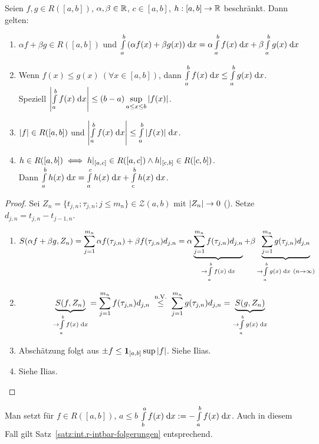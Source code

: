 \documentclass[12pt]{scrreprt}
\begin{document}
\begin{satz}
  \label{satz:int.r-intbar-folgerungen}
  Seien $f,g \in R([a,b])$, $\alpha, \beta \in\mathbb{R}$, $c\in[a,b]$,
  $h:[a,b]\rightarrow\mathbb{R}$ beschränkt. Dann gelten:
  \begin{enumerate}
  \item $\alpha f + \beta g \in R([a,b])$ und
    $\int\limits_{a}^{b}{\left(\alpha f(x) + \beta g(x)\right)}\;\mathrm{d}x =
    \alpha\int\limits_{a}^{b}{f(x)}\;\mathrm{d}x + \beta\int\limits_{a}^{b}{g(x)}\;\mathrm{d}x$
  \item Wenn $f(x)\le g(x)\ (\forall x\in[a,b])$, dann
    $\int\limits_{a}^{b}{f(x)}\;\mathrm{d}x\le\int\limits_{a}^{b}{g(x)}\;\mathrm{d}x$.\\Speziell
    $\left\lvert\int\limits_{a}^{b}{f(x)}\;\mathrm{d}x\right\lvert \le (b-a) \sup\limits_{a \le x \le b}{\left\lvert f(x)\right\lvert}$.
  \item $\left\lvert f\right\lvert\in R([a,b])$ und $\left\lvert\int\limits_{a}^{b}{f(x)}\;\mathrm{d}x\right\lvert \le
    \int\limits_{a}^{b}{\left\lvert f(x)\right\lvert}\;\mathrm{d}x$.
  \item $h\in R([a,b]) \iff h|_{[a,c]}\in R([a,c]) \wedge
    h|_{[c,b]}\in R([c,b])$.\\Dann $\int\limits_{a}^{b}{h(x)}\;\mathrm{d}x =
    \int\limits_{a}^{c}{h(x)}\;\mathrm{d}x + \int\limits_{c}^{b}{h(x)}\;\mathrm{d}x$.
  \end{enumerate}
\end{satz}
\begin{proof}
  Sei $Z_n=\{t_{j,n};\tau_{j,n};j\le m_n\} \in \mathcal{Z}(a,b)$ mit
  $\left\lvert Z_n\right\lvert\to0$ (\ninf). Setze $d_{j,n}=t_{j,n}-t_{j-1,n}$.
  \begin{enumerate}
  \item
    \[ S(\alpha f + \beta g, Z_n) = \sum_{j=1}^{m_n}{\alpha
      f(\tau_{j,n}) + \beta f(\tau_{j,n})d_{j,n}} 
    = \alpha \underbrace{\sum_{j=1}^{m_n}{f(\tau_{j,n})d_{j,n}}}_{\to \int\limits_{a}^{b}{f(x)}\;\mathrm{d}x} + \beta
    \underbrace{\sum_{j=1}^{m_n}{g(\tau_{j,n})d_{j,n}}}_{\to
      \int\limits_{a}^{b}{g(x)}\;\mathrm{d}x\ (n\rightarrow\infty)} \]
  \item \[\underbrace{S(f,Z_n)}_{\to\Integral{a}{b}{f(x)}{x}} =
    \sum_{j=1}^{m_n}{f(\tau_{j,n})d_{j,n}} \nach{\le}{n.V.}
    \sum_{j=1}^{m_n}{g(\tau_{j,n})d_{j,n}} =
    \underbrace{S(g,Z_n)}_{\to\Integral{a}{b}{g(x)}{x}}\]
  \item Abschätzung folgt aus $\pm f \le
    \mathbf{1}_{[a,b]}\sup{\left\lvert f\right\lvert}$. Siehe Ilias.

  \item Siehe Ilias.
  \end{enumerate}
\end{proof}

\noindent Man setzt für $f\in R([a,b])$, $a \le b$
$\int\limits_{b}^{a}{f(x)}\;\mathrm{d}x := -\int\limits_{a}^{b}{f(x)}\;\mathrm{d}x$. Auch in
diesem Fall gilt Satz~\ref{satz:int.r-intbar-folgerungen} entsprechend.
\end{document}
